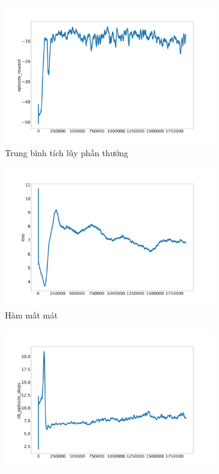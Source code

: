 \begin{figure}[ht]
    \centering
    \begin{subfigure}{.5\textwidth}
      \includegraphics[width=1.1\textwidth]{Pic/First_model_50_reward/episode_reward.png}
      \caption{Trung bình tích lũy phần thưởng}
      \label{fig:first_model:try_2:avg}
    \end{subfigure}%
    \begin{subfigure}{.5\textwidth}
      \includegraphics[width=1.1\textwidth]{Pic/First_model_50_reward/loss.png}
      \caption{Hàm mất mát}
      \label{fig:first_model:try_2:loss}
    \end{subfigure}
    \begin{subfigure}{.5\textwidth}
      \includegraphics[width=1.1\textwidth]{Pic/First_model_50_reward/nb_episode_steps.png}

\end{subfigure}
\end{figure}
